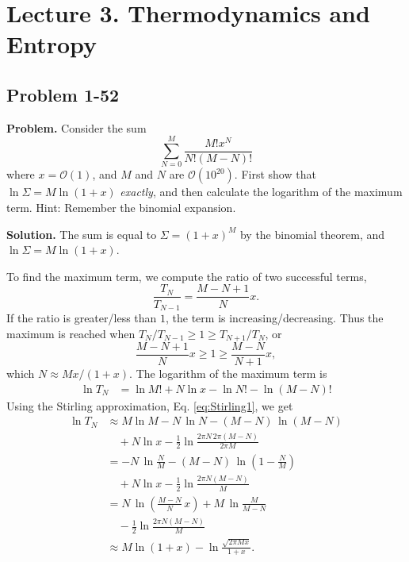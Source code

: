 \documentclass[twocolumn, 10pt]{article}
\numberwithin{equation}{section}
\newenvironment{problem}
{\par\medskip\sffamily \color{problue}
  \textbf{Problem. }\ignorespaces}
{\medskip}
\newenvironment{solution}
{\par\medskip
  \textbf{Solution. }\ignorespaces}
{\medskip}
\begin{document}
\section{Lecture 3. Thermodynamics and Entropy}

\subsection{Problem 1-52}

\begin{problem}
  Consider the sum
  $$
  \sum_{N=0}^M \frac{ M! x^N } { N! (M-N)! }
  $$
  where $x = \mathcal O(1)$,
  and $M$ and $N$ are $\mathcal O(10^{20})$.
  First show that
  $\ln\Sigma = M \ln(1+x)$
  \emph{exactly}, and then calculate
  the logarithm of the maximum term.
  Hint: Remember the binomial expansion.
\end{problem}

\begin{solution}
The sum is equal to $\Sigma = (1+x)^M$ by the binomial theorem,
and $\ln \Sigma = M \ln(1+x)$.

To find the maximum term,
we compute the ratio of two successful terms,
$$
  \frac{ T_N } { T_{N - 1} }
  =
  \frac{ M - N + 1 } { N } x.
$$
If the ratio is greater/less than $1$,
the term is increasing/decreasing.
Thus the maximum is reached when
  $T_N/T_{N-1} \ge 1 \ge T_{N+1}/T_N$, or
$$
  \frac{ M - N + 1} { N } x
  \ge 1 \ge
  \frac{ M - N } { N + 1 } x,
$$
which $N \approx M x /(1+x)$.
The logarithm of the maximum term is
\begin{align*}
  \ln T_N
  &= \ln M! + N \ln x - \ln N! - \ln (M-N)!
\end{align*}
%
Using the Stirling approximation, Eq. \eqref{eq:Stirling1},
we get
\begin{align*}
  \ln T_N
  &\approx M \ln M - N \, \ln N - (M - N) \, \ln(M-N) \\
  &\quad + N \ln x
  -\frac{1}{2} \ln\frac{2\pi N \, 2\pi(M-N)}{2\pi M}
  \\
  &=- N \, \ln \frac{N}{M} - (M - N) \, \ln\left(1-\frac{N}{M}\right) \\
  &\quad + N \ln x
  -\frac{1}{2} \ln\frac{2\pi N (M-N)}{M}
  \\
  &=
  N \, \ln\left( \frac{M-N}{N} \, x \right)
  + M \, \ln \frac{M}{M-N}
  \\
  &\quad -\frac{1}{2} \ln\frac{2\pi N (M-N)}{M}
  \\
  &\approx
  M\ln(1+x) - \ln\frac{ \sqrt{2\pi M x} } { 1 + x}
  .
\end{align*}
\end{solution}
\end{document}
